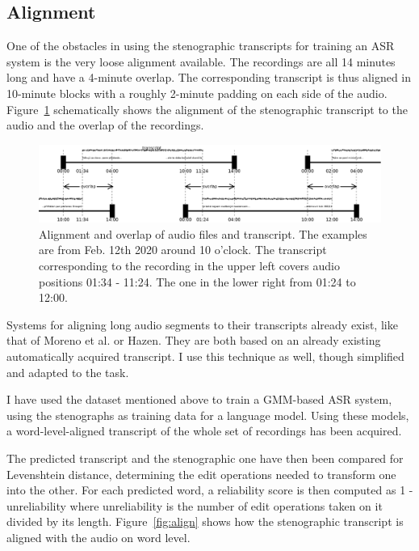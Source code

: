 \documentclass[runningheads]{llncs}
\begin{document}
\subsection{Alignment}

One of the obstacles in using the stenographic transcripts for training an ASR
system is the very loose alignment available. The recordings are all 14 minutes
long and have a 4-minute overlap. The corresponding transcript is thus aligned
in 10-minute blocks with a roughly 2-minute padding on each side of the audio.
Figure~\ref{fig:overlap} schematically shows the alignment of the stenographic
transcript to the audio and the overlap of the recordings.

\begin{figure}[htpb]
\includegraphics[scale=0.25]{rc/overlap.eps}
\caption{Alignment and overlap of audio files and transcript. The examples are
from Feb. 12th 2020 around 10 o'clock. The transcript corresponding to the
recording in the upper left covers audio positions 01:34 - 11:24. The one in the
lower right from 01:24 to 12:00.}
\label{fig:overlap}
\end{figure}

Systems for aligning long audio segments to their transcripts already exist,
like that of Moreno et al.\cite{moreno1998recursive} or
Hazen\cite{hazen2006automatic}. They are both based on an already existing
automatically acquired transcript. I use this technique as well, though 
simplified and adapted to the task.

I have used the dataset mentioned above\cite{pspdata} to train a GMM-based ASR
system, using the stenographs as training data for a language model. Using these
models, a word-level-aligned transcript of the whole set of recordings has been
acquired.

The predicted transcript and the stenographic one have then been compared for
Levenshtein distance, determining the edit operations needed to transform one
into the other. For each predicted word, a reliability score is then
computed as 1 - unreliability where unreliability is the number of edit
operations taken on it divided by its length.
Figure~\ref{fig:align} shows how the stenographic transcript is aligned with the
audio on word level.
\end{document}
